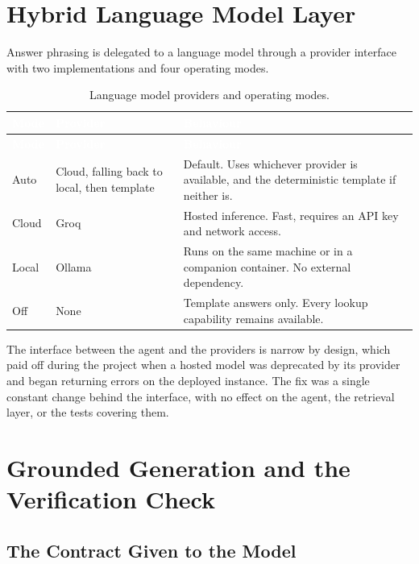 \section{Hybrid Language Model Layer}

Answer phrasing is delegated to a language model through a provider interface with two implementations and four operating modes.

\begin{longtable}{|p{}|p{}|p{}|}
\caption{Language model providers and operating modes.}\label{tab:llm}\\
\hline
\rowcolor{myblue}\textcolor{white}{\textbf{Mode}} & \textcolor{white}{\textbf{Provider}} & \textcolor{white}{\textbf{Behaviour}} \\
\hline
\endfirsthead
\hline
\rowcolor{myblue}\textcolor{white}{\textbf{Mode}} & \textcolor{white}{\textbf{Provider}} & \textcolor{white}{\textbf{Behaviour}} \\
\hline
\endhead
Auto & Cloud, falling back to local, then template & Default. Uses whichever provider is available, and the deterministic template if neither is. \\ \hline
Cloud & Groq & Hosted inference. Fast, requires an API key and network access. \\ \hline
Local & Ollama & Runs on the same machine or in a companion container. No external dependency. \\ \hline
Off & None & Template answers only. Every lookup capability remains available. \\ \hline
\end{longtable}

The interface between the agent and the providers is narrow by design, which paid off during the project when a hosted model was deprecated by its provider and began returning errors on the deployed instance. The fix was a single constant change behind the interface, with no effect on the agent, the retrieval layer, or the tests covering them.

\section{Grounded Generation and the Verification Check}

\subsection{The Contract Given to the Model}

